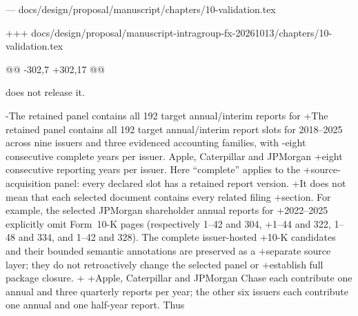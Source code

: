 --- docs/design/proposal/manuscript/chapters/10-validation.tex

+++ docs/design/proposal/manuscript-intragroup-fx-20261013/chapters/10-validation.tex

@@ -302,7 +302,17 @@

 does not release it.
 
-The retained panel contains all 192 target annual/interim reports for
+The retained panel contains all 192 target annual/interim report slots for
 2018--2025 across nine issuers and three evidenced accounting families, with
-eight consecutive complete years per issuer. Apple, Caterpillar and JPMorgan
+eight consecutive reporting years per issuer. Here ``complete'' applies to the
+source-acquisition panel: every declared slot has a retained report version.
+It does not mean that each selected document contains every related filing
+section. For example, the selected JPMorgan shareholder annual reports for
+2022--2025 explicitly omit Form~10-K pages (respectively 1--42 and 304,
+1--44 and 322, 1--48 and 334, and 1--42 and 328). The complete issuer-hosted
+10-K candidates and their bounded semantic annotations are preserved as a
+separate source layer; they do not retroactively change the selected panel or
+establish full package closure.
+
+Apple, Caterpillar and JPMorgan
 Chase each contribute one annual and three quarterly reports per year; the
 other six issuers each contribute one annual and one half-year report. Thus
